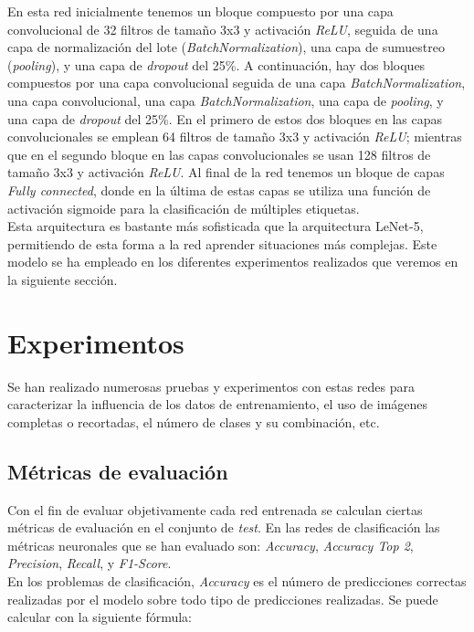 En esta red inicialmente tenemos un bloque compuesto por una capa convolucional de 32 filtros de tamaño 3x3 y activación \textit{ReLU}, seguida de una capa de normalización del lote (\textit{BatchNormalization}), una capa de sumuestreo (\textit{pooling}), y una capa de \textit{dropout} del 25\%. A continuación, hay dos bloques compuestos por una capa convolucional seguida de una capa \textit{BatchNormalization}, una capa convolucional, una capa \textit{BatchNormalization}, una capa de \textit{pooling}, y una capa de \textit{dropout} del 25\%. En el primero de estos dos bloques en las capas convolucionales se emplean 64 filtros de tamaño 3x3 y activación \textit{ReLU}; mientras que en el segundo bloque en las capas convolucionales se usan 128 filtros de tamaño 3x3 y activación \textit{ReLU}. Al final de la red tenemos un bloque de capas \textit{Fully connected}, donde en la última de estas capas se utiliza una función de activación sigmoide para la clasificación de múltiples etiquetas.\\


Esta arquitectura es bastante más sofisticada que la arquitectura LeNet-5, permitiendo de esta forma a la red aprender situaciones más complejas. Este modelo se ha empleado en los diferentes experimentos realizados que veremos en la siguiente sección.


\section{Experimentos}
Se han realizado numerosas pruebas y experimentos con estas redes para caracterizar la influencia de los datos de entrenamiento, el uso de imágenes completas o recortadas, el número de clases y su combinación, etc.\\


\subsection{Métricas de evaluación}\label{metrica_clasificacion}

Con el fin de evaluar objetivamente cada red entrenada se calculan ciertas métricas de evaluación en el conjunto de \textit{test}. En las redes de clasificación las métricas neuronales que se han evaluado son: \textit{Accuracy}, \textit{Accuracy Top 2}, \textit{Precision}, \textit{Recall}, y \textit{F1-Score}.\\

En los problemas de clasificación, \textit{Accuracy} es el número de predicciones correctas realizadas por el modelo sobre todo tipo de predicciones realizadas. Se puede calcular con la siguiente fórmula:

